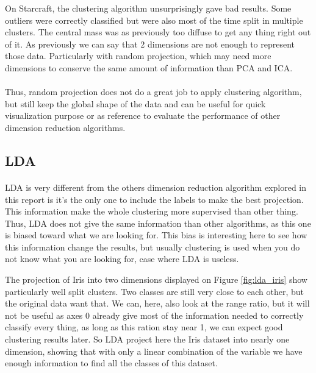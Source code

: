 \documentclass[twocolumn,a4paper,10pt]{article}
\begin{document}
On Starcraft, the clustering algorithm unsurprisingly gave bad results. Some outliers were correctly classified but were also most of the time split in multiple clusters. The central mass was as previously too diffuse to get any thing right out of it. As previously we can say that 2 dimensions are not enough to represent those data. Particularly with random projection, which may need more dimensions to conserve the same amount of information than PCA and ICA.

\paragraph{}
Thus, random projection does not do a great job to apply clustering algorithm, but still keep the global shape of the data and can be useful for quick visualization purpose or as reference to evaluate the performance of other dimension reduction algorithms.

\subsection{LDA}
\paragraph{}

LDA is very different from the others dimension reduction algorithm explored in this report is it's the only one to include the labels to make the best projection. This information make the whole clustering more supervised than other thing. Thus, LDA does not give the same information than other algorithms, as this one is biased toward what we are looking for. This bias is interesting here to see how this information change the results, but usually clustering is used when you do not know what you are looking for, case where LDA is useless.

The projection of Iris into two dimensions displayed on Figure \ref{fig:lda_iris} show particularly well split clusters. Two classes are still very close to each other, but the original data want that. We can, here, also look at the range ratio, but it will not be useful as axes 0 already give most of the information needed to correctly classify every thing, as long as this ration stay near 1, we can expect good clustering results later. So LDA project here the Iris dataset into nearly one dimension, showing that with only a linear combination of the variable we have enough information to find all the classes of this dataset.
\end{document}
